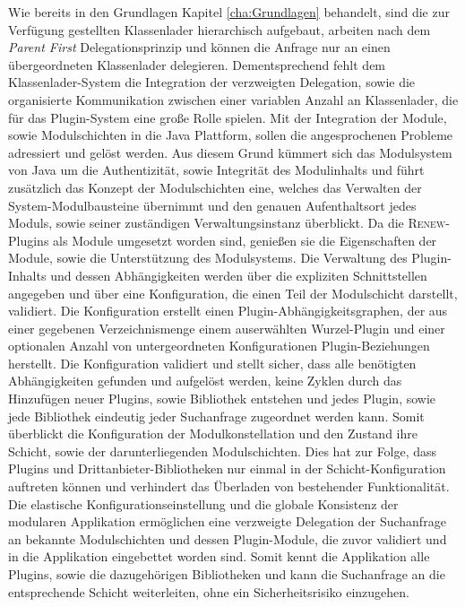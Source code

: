 	Wie bereits in den Grundlagen Kapitel \ref{cha:Grundlagen} behandelt, sind die zur Verfügung gestellten Klassenlader hierarchisch aufgebaut, arbeiten nach dem \textit{Parent First} Delegationsprinzip und können die Anfrage nur an einen übergeordneten Klassenlader delegieren. Dementsprechend fehlt dem Klassenlader-System die Integration der verzweigten Delegation, sowie die organisierte Kommunikation zwischen einer variablen Anzahl an Klassenlader, die für das Plugin-System eine große Rolle spielen.\newline
	Mit der Integration der Module, sowie Modulschichten in die Java Plattform, sollen die angesprochenen Probleme adressiert und gelöst werden. Aus diesem Grund kümmert sich das Modulsystem von Java um die Authentizität, sowie Integrität des Modulinhalts und führt zusätzlich das Konzept der Modulschichten eine, welches das Verwalten der System-Modulbausteine übernimmt und den genauen Aufenthaltsort jedes Moduls, sowie seiner zuständigen Verwaltungsinstanz überblickt. Da die \textsc{Renew}-Plugins als Module umgesetzt worden sind, genießen sie die Eigenschaften der Module, sowie die Unterstützung des Modulsystems.\newline
	Die Verwaltung des Plugin-Inhalts und dessen Abhängigkeiten werden über die expliziten Schnittstellen angegeben und über eine Konfiguration, die einen Teil der Modulschicht darstellt, validiert. Die Konfiguration erstellt einen Plugin-Abhängigkeitsgraphen, der aus einer gegebenen Verzeichnismenge einem auserwählten Wurzel-Plugin und einer optionalen Anzahl von untergeordneten Konfigurationen Plugin-Beziehungen herstellt. Die Konfiguration validiert und stellt sicher, dass alle benötigten Abhängigkeiten gefunden und aufgelöst werden, keine Zyklen durch das Hinzufügen neuer Plugins, sowie Bibliothek entstehen und jedes Plugin, sowie jede Bibliothek eindeutig jeder Suchanfrage zugeordnet werden kann. Somit überblickt die Konfiguration der Modulkonstellation und den Zustand ihre Schicht, sowie der darunterliegenden Modulschichten. Dies hat zur Folge, dass Plugins und Drittanbieter-Bibliotheken nur einmal in der Schicht-Konfiguration auftreten können und verhindert das Überladen von bestehender Funktionalität.\newline
	Die elastische Konfigurationseinstellung und die globale Konsistenz der modularen Applikation ermöglichen eine verzweigte Delegation der Suchanfrage an bekannte Modulschichten und dessen Plugin-Module, die zuvor validiert und in die Applikation eingebettet worden sind. Somit kennt die Applikation alle Plugins, sowie die dazugehörigen Bibliotheken und kann die Suchanfrage an die entsprechende Schicht weiterleiten, ohne ein Sicherheitsrisiko einzugehen.\newline
